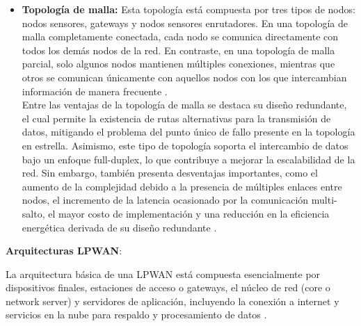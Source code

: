 \begin{itemize}
      \item \textbf{Topología de malla:} Esta topología está compuesta por tres
            tipos  de  nodos:  nodos  sensores,  gateways   y   nodos   sensores
            enrutadores. En una topología de malla completamente conectada, cada
            nodo se comunica directamente con todos los demás nodos de  la  red.
            En contraste, en una topología de malla parcial, solo algunos  nodos
            mantienen múltiples conexiones,  mientras  que  otros  se  comunican
            únicamente con aquellos nodos con los que  intercambian  información
            de manera frecuente \parencite[]{chilamkurthy2022low}.\\  Entre  las
            ventajas de la topología de malla se destaca su  diseño  redundante,
            el  cual  permite  la  existencia  de  rutas  alternativas  para  la
            transmisión de datos, mitigando el problema del punto único de fallo
            presente en  la  topología  en  estrella.  Asimismo,  este  tipo  de
            topología  soporta  el  intercambio  de  datos   bajo   un   enfoque
            full-duplex, lo que contribuye a mejorar la escalabilidad de la red.
            Sin embargo,  también  presenta  desventajas  importantes,  como  el
            aumento de la complejidad debido a la presencia de múltiples enlaces
            entre  nodos,  el  incremento  de  la  latencia  ocasionado  por  la
            comunicación multi-salto, el mayor costo  de  implementación  y  una
            reducción  en  la  eficiencia  energética  derivada  de  su   diseño
            redundante \parencite[]{chilamkurthy2022low}.
\end{itemize}

\textbf{Arquitecturas LPWAN}:

La  arquitectura  básica  de  una  LPWAN  está   compuesta   esencialmente   por
dispositivos finales, estaciones de acceso o gateways, el núcleo de red (core  o
network server) y servidores de aplicación, incluyendo la conexión a internet  y
servicios   en   la   nube   para   respaldo   y    procesamiento    de    datos
\parencite[]{chilamkurthy2022low}.

